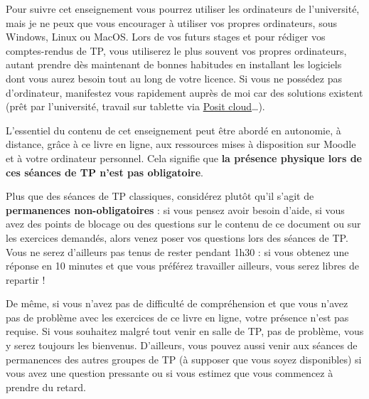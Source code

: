\documentclass[
  a4paper,
  DIV=11,
  numbers=noendperiod,
  oneside]{scrreprt}
\begin{document}
Pour suivre cet enseignement vous pourrez utiliser les ordinateurs de
l'université, mais je ne peux que vous encourager à utiliser vos propres
ordinateurs, sous Windows, Linux ou MacOS. Lors de vos futurs stages et
pour rédiger vos comptes-rendus de TP, vous utiliserez le plus souvent
vos propres ordinateurs, autant prendre dès maintenant de bonnes
habitudes en installant les logiciels dont vous aurez besoin tout au
long de votre licence. Si vous ne possédez pas d'ordinateur, manifestez
vous rapidement auprès de moi car des solutions existent (prêt par
l'université, travail sur tablette via \href{https://posit.cloud}{Posit
cloud}\ldots).

\begin{tcolorbox}[enhanced jigsaw, arc=.35mm, opacityback=0, colbacktitle=quarto-callout-important-color!10!white, bottomrule=.15mm, coltitle=black, colframe=quarto-callout-important-color-frame, breakable, toprule=.15mm, title=\textcolor{quarto-callout-important-color}{\faExclamation}\hspace{0.5em}{Important}, leftrule=.75mm, titlerule=0mm, bottomtitle=1mm, toptitle=1mm, left=2mm, rightrule=.15mm, opacitybacktitle=0.6, colback=white]

L'essentiel du contenu de cet enseignement peut être abordé en
autonomie, à distance, grâce à ce livre en ligne, aux ressources mises à
disposition sur Moodle et à votre ordinateur personnel. Cela signifie
que \textbf{la présence physique lors de ces séances de TP n'est pas
obligatoire}.

\end{tcolorbox}

Plus que des séances de TP classiques, considérez plutôt qu'il s'agit de
\textbf{permanences non-obligatoires} : si vous pensez avoir besoin
d'aide, si vous avez des points de blocage ou des questions sur le
contenu de ce document ou sur les exercices demandés, alors venez poser
vos questions lors des séances de TP. Vous ne serez d'ailleurs pas tenus
de rester pendant 1h30 : si vous obtenez une réponse en 10 minutes et
que vous préférez travailler ailleurs, vous serez libres de repartir !

De même, si vous n'avez pas de difficulté de compréhension et que vous
n'avez pas de problème avec les exercices de ce livre en ligne, votre
présence n'est pas requise. Si vous souhaitez malgré tout venir en salle
de TP, pas de problème, vous y serez toujours les bienvenus. D'ailleurs,
vous pouvez aussi venir aux séances de permanences des autres groupes de
TP (à supposer que vous soyez disponibles) si vous avez une question
pressante ou si vous estimez que vous commencez à prendre du retard.
\end{document}
